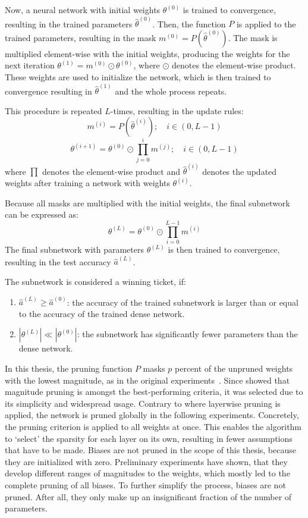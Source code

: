 Now, a neural network with initial weights $\theta^{(0)}$ is trained to convergence, resulting in the trained parameters $\hat \theta^{(0)}$.
Then, the function $\textit{P}$ is applied to the trained parameters, resulting in the mask $m^{(0)} = \textit{P}(\hat \theta^{(0)})$.
The mask is multiplied element-wise with the initial weights, producing the weights for the next iteration $\theta^{(1)} = m^{(0)} \odot \theta^{(0)}$, where $\odot$ denotes the element-wise product.
These weights are used to initialize the network, which is then trained to convergence resulting in $\hat \theta^{(1)}$ and the whole process repeats.

This procedure is repeated $L$-times, resulting in the update rules:
\[ m^{(i)} = \textit{P}(\hat \theta^{(i)}); \quad i \in (0,L-1) \]
\[ \theta^{(i+1)} = \theta^{(0)} \odot \prod_{j=0}^{i}m^{(j)}; \quad i \in (0,L-1) \] 
where $\prod$ denotes the element-wise product and $\hat \theta^{(i)}$ denotes the updated weights after training a network with weights $\theta^{(i)}$.

Because all masks are multiplied with the initial weights, the final subnetwork can be expressed as:
\[\theta^{(L)} = \theta^{(0)} \odot \prod_{i=0}^{L-1}m^{(i)} \]
The final subnetwork with parameters $\theta^{(L)}$ is then trained to convergence, resulting in the test accuracy $\hat a^{(L)}$.

The subnetwork is considered a winning ticket, if:
\begin{enumerate}
  \item  $\hat a^{(L)} \geq \hat a^{(0)}$: the accuracy of the trained subnetwork is larger than or equal to the accuracy of the trained dense network.
  \item $|\theta^{(L)}| \ll |\theta^{(0)}|$: the subnetwork has significantly fewer parameters than the dense network.
\end{enumerate}

In this thesis, the pruning function $P$ masks $p$ percent of the unpruned weights with the lowest magnitude, as in the original experiments~\autocite{LTH}. 
Since \autocite{Supermasks} showed that magnitude pruning is amongst the best-performing criteria, it was selected due to its simplicity and widespread usage.
Contrary to \autocite{LTH} where layerwise pruning is applied, the network is pruned globally in the following experiments.
Concretely, the pruning criterion is applied to all weights at once.
This enables the algorithm to `select' the sparsity for each layer on its own, resulting in fewer assumptions that have to be made.
Biases are not pruned in the scope of this thesis, because they are initialized with zero.
Preliminary experiments have shown, that they develop different ranges of magnitudes to the weights, which mostly led to the complete pruning of all biases.
To further simplify the process, biases are not pruned.
After all, they only make up an insignificant fraction of the number of parameters. 

